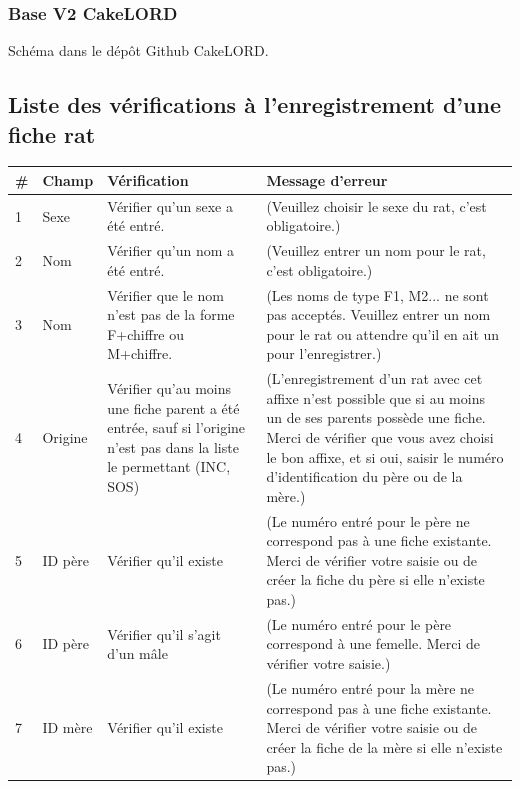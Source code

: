 \documentclass[a4paper,10pt]{article}
\begin{document}
\subsubsection{Base V2 CakeLORD}
\label{app:dbv2}
Schéma dans le dépôt Github CakeLORD.

\subsection{Liste des vérifications à l'enregistrement d'une fiche rat}
\label{app:verifs}
\small
\noindent\begin{tabular}{|p{0.35cm}|p{1.35cm}|p{5cm}|p{8.5cm}|}\hline
\textbf{\#} & \textbf{Champ} & \textbf{Vérification} & \textbf{Message d'erreur}\\\hline

1 & Sexe & Vérifier qu'un sexe a été entré. & (Veuillez choisir le sexe du rat, c'est obligatoire.) \\\hline

2 & Nom & Vérifier qu'un nom a été entré. &(Veuillez entrer un nom pour le rat, c'est obligatoire.) \\\hline

3 & Nom & Vérifier que le nom n'est pas de la forme F+chiffre ou M+chiffre. & (Les noms de type F1, M2... ne sont pas acceptés. Veuillez entrer un nom pour le rat ou attendre qu'il en ait un pour l'enregistrer.) \\\hline

4 & Origine & Vérifier qu'au moins une fiche parent a été entrée, sauf si l'origine n'est pas dans la liste le permettant (INC, SOS) & (L'enregistrement d'un rat avec cet affixe n'est possible que si au moins un de ses parents possède une fiche. Merci de vérifier que vous avez choisi le bon affixe, et si oui, saisir le numéro d'identification du père ou de la mère.) \\\hline

5 & ID père & Vérifier qu'il existe & (Le numéro entré pour le père ne correspond pas à une fiche existante. Merci de vérifier votre saisie ou de créer la fiche du père si elle n'existe pas.) \\\hline


6 & ID père & Vérifier qu'il s'agit d'un mâle & (Le numéro entré pour le père correspond à une femelle. Merci de vérifier votre saisie.)\\\hline


7 & ID mère & Vérifier qu'il existe & (Le numéro entré pour la mère ne correspond pas à une fiche existante. Merci de vérifier votre saisie ou de créer la fiche de la mère si elle n'existe pas.)\\\hline



\end{tabular}
\end{document}
